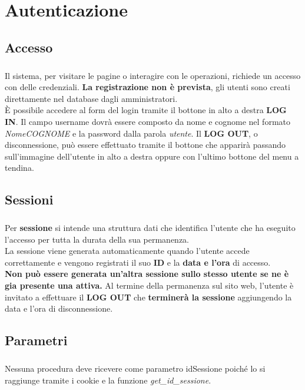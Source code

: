 \documentclass[a4paper, 12pt]{report}
\begin{document}
    \chapter{Autenticazione}
        \section{Accesso}
            \paragraph{}Il sistema, per visitare le pagine o interagire con le operazioni, richiede un accesso con delle credenziali.
            \textbf{La registrazione non è prevista}, gli utenti sono creati direttamente nel database dagli amministratori.\\
            È possibile accedere al form del login tramite il bottone in alto a destra \textbf{LOG IN}. 
            Il campo username dovrà essere composto da nome e cognome nel formato \textit{NomeCOGNOME} e la password dalla parola \textit{utente}.
            Il \textbf{LOG OUT}, o disconnessione, può essere effettuato tramite il bottone che apparirà passando sull'immagine dell'utente in alto a destra
            oppure con l'ultimo bottone del menu a tendina.
        \section{Sessioni}
            \paragraph{}Per \textbf{sessione} si intende una struttura dati che identifica l'utente che ha eseguito l'accesso per tutta la durata della sua permanenza.\\
            La sessione viene generata automaticamente quando l'utente accede correttamente e vengono registrati il suo \textbf{ID} e la \textbf{data e l'ora} di accesso.\\
            \textbf{Non può essere generata un'altra sessione sullo stesso utente se ne è gia presente una attiva.}
            Al termine della permanenza sul sito web, l'utente è invitato a effettuare il \textbf{LOG OUT} che \textbf{terminerà la sessione}
            aggiungendo la data e l'ora di disconnessione. 
        \section{Parametri}
            \paragraph{}Nessuna procedura deve ricevere come parametro idSessione poiché lo si raggiunge tramite i cookie e la funzione \textit{get\_id\_sessione}.
\end{document}
